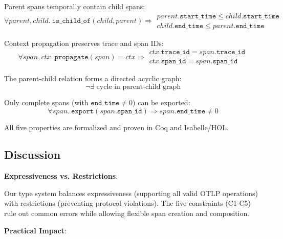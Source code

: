 \begin{property}
\label{prop:temporal}
Parent spans temporally contain child spans:
\[
\forall parent, child.\ \texttt{is\_child\_of}(child, parent) \Rightarrow 
\begin{array}{l}
parent.\texttt{start\_time} \leq child.\texttt{start\_time} \\
child.\texttt{end\_time} \leq parent.\texttt{end\_time}
\end{array}
\]
\end{property}

\begin{property}
\label{prop:propagation}
Context propagation preserves trace and span IDs:
\[
\forall span, ctx.\ \texttt{propagate}(span) = ctx \Rightarrow 
\begin{array}{l}
ctx.\texttt{trace\_id} = span.\texttt{trace\_id} \\
ctx.\texttt{span\_id} = span.\texttt{span\_id}
\end{array}
\]
\end{property}

\begin{property}
\label{prop:dag}
The parent-child relation forms a directed acyclic graph:
\[
\neg \exists \text{ cycle in parent-child graph}
\]
\end{property}

\begin{property}
\label{prop:export}
Only complete spans (with $\texttt{end\_time} \neq 0$) can be exported:
\[
\forall span.\ \texttt{export}(span.\texttt{span\_id}) \Rightarrow span.\texttt{end\_time} \neq 0
\]
\end{property}

All five properties are formalized and proven in Coq and Isabelle/HOL.

\subsection{Discussion}
\label{sec:formal-discussion}

\textbf{Expressiveness vs. Restrictions}:

Our type system balances expressiveness (supporting all valid OTLP operations) with restrictions (preventing protocol violations). The five constraints (C1-C5) rule out common errors while allowing flexible span creation and composition.

\textbf{Practical Impact}:


